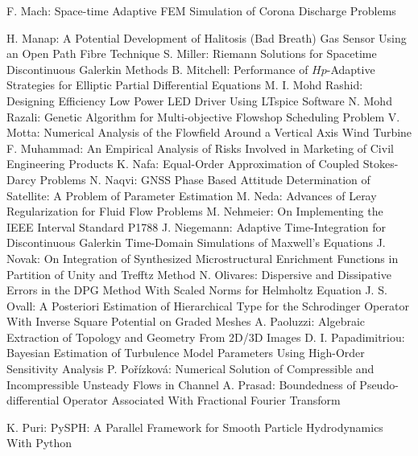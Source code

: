 \documentclass[10pt, A4]{article}%
\begin{document}
{F. Mach}: {Space-time Adaptive FEM Simulation of Corona Discharge Problems}

{H. Manap}: {A Potential Development of Halitosis (Bad Breath) Gas Sensor Using an Open Path Fibre Technique}
{S. Miller}: {Riemann Solutions for Spacetime Discontinuous Galerkin Methods}
{B. Mitchell}: {Performance of $Hp$-Adaptive Strategies for Elliptic Partial Differential Equations}
{M. I. Mohd Rashid}: {Designing Efficiency Low Power LED Driver Using LTspice Software}
{N. Mohd Razali}: {Genetic Algorithm for Multi-objective Flowshop Scheduling Problem}
{V. Motta}: {Numerical Analysis of the Flowfield Around a Vertical Axis Wind Turbine}
{F. Muhammad}: {An Empirical Analysis of Risks Involved in Marketing of Civil Engineering Products}
{K. Nafa}: {Equal-Order Approximation of Coupled Stokes-Darcy Problems}
{N. Naqvi}: {GNSS Phase Based Attitude Determination of Satellite: A Problem of Parameter Estimation}
{M. Neda}: {Advances of Leray Regularization for Fluid Flow Problems}
{M. Nehmeier}: {On Implementing  the IEEE Interval Standard P1788}
{J. Niegemann}: {Adaptive Time-Integration for Discontinuous Galerkin Time-Domain Simulations of Maxwell's Equations}
{J. Novak}: {On Integration of Synthesized Microstructural Enrichment Functions in Partition of Unity and Trefftz Method}
{N. Olivares}: {Dispersive and Dissipative Errors in the DPG Method With Scaled Norms for Helmholtz Equation}
{J. S. Ovall}: {A Posteriori Estimation of Hierarchical Type for the  Schrodinger Operator With Inverse Square Potential on Graded Meshes}
{A. Paoluzzi}: {Algebraic Extraction of Topology and Geometry From 2D/3D Images}
{D. I. Papadimitriou}: {Bayesian Estimation of Turbulence Model Parameters Using High-Order Sensitivity Analysis}
{P. Pořízková}: {Numerical Solution of Compressible and Incompressible Unsteady Flows in Channel}
{A. Prasad}: {Boundedness of Pseudo-differential Operator Associated With Fractional Fourier Transform}

{K. Puri}: {PySPH: A Parallel Framework for Smooth Particle Hydrodynamics With Python}
\end{document}
